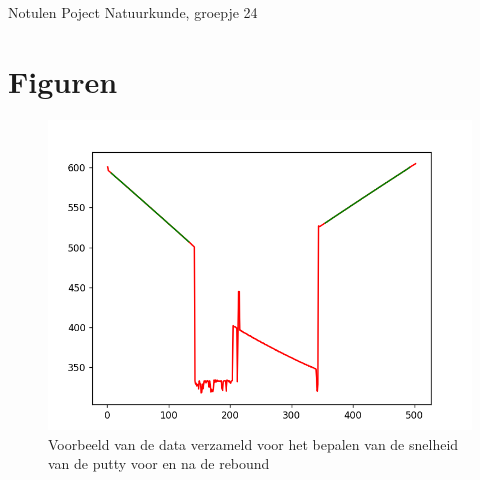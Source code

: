 \documentclass[11pt,a4paper]{article}
\begin{document}
\begin{Minutes}{Notulen Poject Natuurkunde, groepje 24}
\section{Figuren}
\begin{figure}[h]
    \centering
    \includegraphics[width=0.5\linewidth]{Snelheidbepalen.png}
    \caption{Voorbeeld van de data verzameld voor het bepalen van de snelheid van de putty voor en na de rebound}
    \label{fig:enter-label}
\end{figure}

\listoftasks


\end{Minutes}
\end{document}
